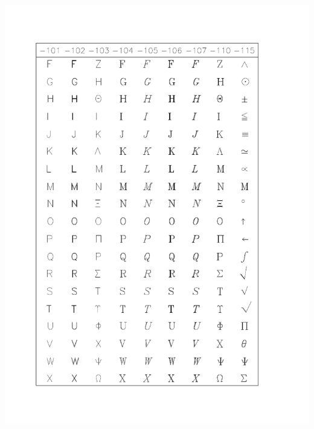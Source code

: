 \documentclass[11pt,nolof]{starlink}
\begin{document}
\includegraphics[height=0.95\textheight]{sun83_c3}
\end{document}
